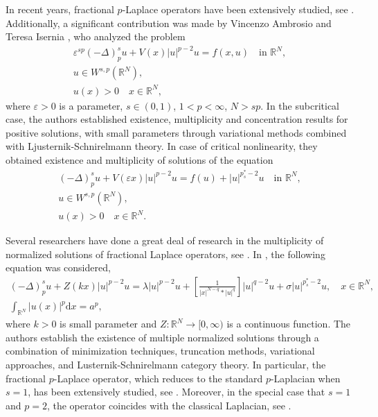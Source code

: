 \documentclass[10pt,a4paper]{amsart}
\numberwithin{equation}{section}
\begin{document}
In recent years, fractional $p$-Laplace operators have been extensively studied,
see \cite{ref3, ref4, ref18, ref26, ref32}. Additionally, a significant contribution was
made by Vincenzo Ambrosio and Teresa Isernia  \cite{ref1}, who analyzed the problem
\begin{gather*}
\varepsilon^{sp}(-\Delta)_p^{s} u+V(x)|u|^{p-2}u=f(x,u)\quad\text{in }\mathbb{R}^N,\\
u\in W^{s,p}(\mathbb{R}^N),\\
u(x)>0\quad  x\in\mathbb{R}^N,
\end{gather*}
where $\varepsilon>0$ is a parameter, $s\in(0,1)$, $1<p<\infty$, $N>sp$.
In the subcritical case, the authors established existence, multiplicity and concentration
results for positive solutions, with small parameters through variational methods combined with Ljusternik-Schnirelmann theory.
In case of  critical nonlinearity, they obtained existence and multiplicity of solutions of the equation
\begin{gather*}
(-\Delta)_p^{s} u+V(\varepsilon x)|u|^{p-2}u=f(u)+|u|^{p_{s}^{*}-2}u\quad\text{in }\mathbb{R}^N,\\
u\in W^{s,p}(\mathbb{R}^N),\\
u(x)>0\quad x\in\mathbb{R}^N.
\end{gather*}

Several researchers have done a great deal of research in the multiplicity of
normalized solutions of fractional Laplace operators, see \cite{ref23, ref27, ref35}.
In \cite{ref36}, the following equation was considered,
\begin{gather*}
(-\Delta)_p^{s} u+Z(kx)|u|^{p-2}u=\lambda|u|^{p-2}u+[\frac{1}{|x|^{N-q}*|u|^{q}}]|u|^{q-2}u
+\sigma|u|^{p_s^{*}-2}u,\quad x\in \mathbb{R}^{N},\\
\int_{\mathbb{R}^{N}}|u(x)|^{p}\mathrm{d}x=a^{p},
\end{gather*}
where $k>0$ is small parameter and $Z:\mathbb{R}^N\to[0,\infty)$ is a continuous function.
The authors establish the existence of multiple normalized solutions through a combination
of minimization techniques, truncation methods, variational approaches,
and Lusternik-Schnirelmann category theory. In particular, the fractional $p$-Laplace
operator, which reduces to the standard $p$-Laplacian when $s = 1$, has been extensively
studied, see \cite{ref6, ref15, ref21, n2}.
Moreover, in the special case that $s = 1$ and $p = 2$, the operator coincides with the classical Laplacian, see \cite{ref12, ref28, ref29}.
\end{document}
